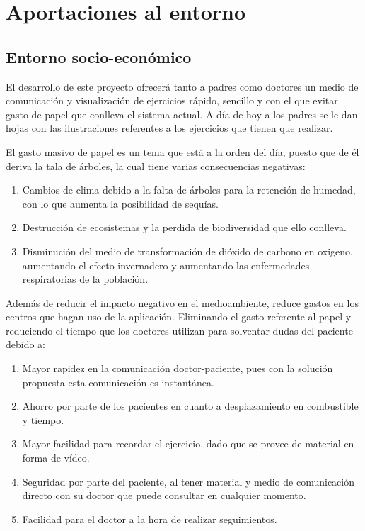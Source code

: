 \section{Aportaciones al entorno}
\subsection{Entorno socio-económico}
El desarrollo de este proyecto ofrecerá tanto a padres como doctores un medio de comunicación
y visualización de ejercicios rápido, sencillo y con el que evitar gasto de papel que conlleva
el sistema actual. A día de hoy a los padres se le dan hojas con las ilustraciones referentes
a los ejercicios que tienen que realizar.

\medskip
El gasto masivo de papel es un tema que está a la orden del día, puesto que de él deriva la
tala de árboles, la cual tiene varias consecuencias negativas:
\begin{enumerate}
    \item Cambios de clima debido a la falta de árboles para la retención de humedad, con lo que aumenta la posibilidad de sequías.
    \item Destrucción de ecosistemas y la perdida de biodiversidad que ello conlleva.
    \item Disminución del medio de transformación de dióxido de carbono en oxigeno, aumentando el efecto invernadero y aumentando las enfermedades respiratorias de la población.
\end{enumerate}

\bigskip
Además de reducir el impacto negativo en el medioambiente, reduce gastos en los centros
que hagan uso de la aplicación. Eliminando el gasto referente al papel y reduciendo el
tiempo que los doctores utilizan para solventar dudas del paciente debido a:
\begin{enumerate}
    \item Mayor rapidez en la comunicación doctor-paciente, pues con la solución propuesta esta comunicación es instantánea.
    \item Ahorro por parte de los pacientes en cuanto a desplazamiento en combustible y tiempo.
    \item Mayor facilidad para recordar el ejercicio, dado que se provee de material en forma de vídeo.
    \item Seguridad por parte del paciente, al tener material y medio de comunicación directo con su doctor que puede consultar en cualquier momento.
    \item Facilidad para el doctor a la hora de realizar seguimientos.
\end{enumerate}

